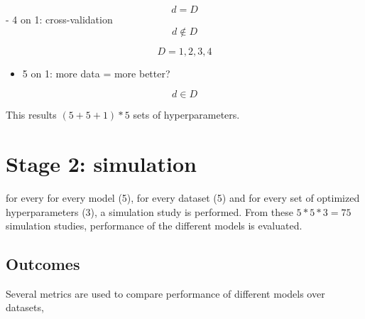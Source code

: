 \documentclass[
]{book}
\providecommand{\tightlist}{%
  \setlength{\itemsep}{0pt}\setlength{\parskip}{0pt}}
\begin{document}
\[ d = D \]
- 4 on 1: cross-validation
\[ d \notin D\]

\[ D = {1, 2, 3, 4}\]

\begin{itemize}
\tightlist
\item
  5 on 1: more data = more better?
\end{itemize}

\[ d \in D \]

This results \((5+5+1)*5\) sets of hyperparameters.

\hypertarget{stage-2-simulation-1}{%
\section{Stage 2: simulation}\label{stage-2-simulation-1}}

for every for every model (5), for every dataset (5) and for every set of optimized hyperparameters (3), a simulation study is performed. From these \(5*5*3=75\) simulation studies, performance of the different models is evaluated.

\hypertarget{outcomes}{%
\subsection{Outcomes}\label{outcomes}}

Several metrics are used to compare performance of different models over datasets,
\end{document}
